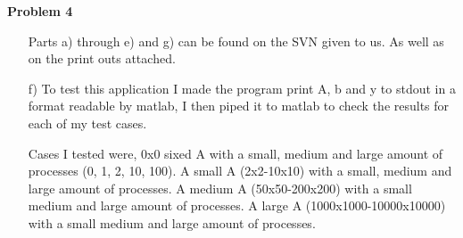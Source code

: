 \documentclass[12pt]{article}
\begin{document}
\textbf{Problem 4}
\begin{itemize}

    \item[] Parts a) through e) and g) can be found on the SVN given to us.
            As well as on the print outs attached.

    \item[f)] To test this application I made the program print A, b and y
              to stdout in a format readable by matlab, I then piped it to
              matlab to check the results for each of my test cases.

    \item[] Cases I tested were, 0x0 sixed A with a small, medium and large
            amount of processes (0, 1, 2, 10, 100). A small A (2x2-10x10)
            with a small, medium and large amount of processes. A medium A
            (50x50-200x200) with a small medium and large amount of processes.
            A large A (1000x1000-10000x10000) with a small medium and large
            amount of processes.

\end{itemize}
\end{document}

